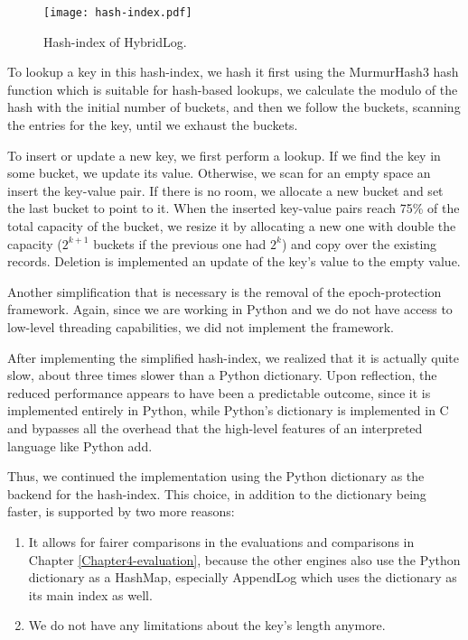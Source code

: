 \vspace{20px}
\begin{figure}[h]
    \centering
    \texttt{[image: hash-index.pdf]}
    \caption{Hash-index of HybridLog.}
    \label{fig:hash-index}
\end{figure}
\vspace{20px}

To lookup a key in this hash-index, we hash it first using the MurmurHash3 hash function which is suitable for hash-based lookups, we calculate the modulo of the hash with the initial number of buckets, and then we follow the buckets, scanning the entries for the key, until we exhaust the buckets.

To insert or update a new key, we first perform a lookup. If we find the key in some bucket, we update its value. Otherwise, we scan for an empty space an insert the key-value pair. If there is no room, we allocate a new bucket and set the last bucket to point to it. When the inserted key-value pairs reach 75\% of the total capacity of the bucket, we resize it by allocating a new one with double the capacity ($2^{k+1}$ buckets if the previous one had $2^{k}$) and copy over the existing records. Deletion is implemented an update of the key's value to the empty value.

Another simplification that is necessary is the removal of the epoch-protection framework. Again, since we are working in Python and we do not have access to low-level threading capabilities, we did not implement the framework.

After implementing the simplified hash-index, we realized that it is actually quite slow, about three times slower than a Python dictionary. Upon reflection, the reduced performance appears to have been a predictable outcome, since it is implemented entirely in Python, while Python's dictionary is implemented in C and bypasses all the overhead that the high-level features of an interpreted language like Python add.

Thus, we continued the implementation using the Python dictionary as the backend for the hash-index. This choice, in addition to the dictionary being faster, is supported by two more reasons:
\begin{enumerate}
    \item It allows for fairer comparisons in the evaluations and comparisons in Chapter \ref{Chapter4-evaluation}, because the other engines also use the Python dictionary as a HashMap, especially AppendLog which uses the dictionary as its main index as well.
    \item We do not have any limitations about the key's length anymore.
\end{enumerate}

